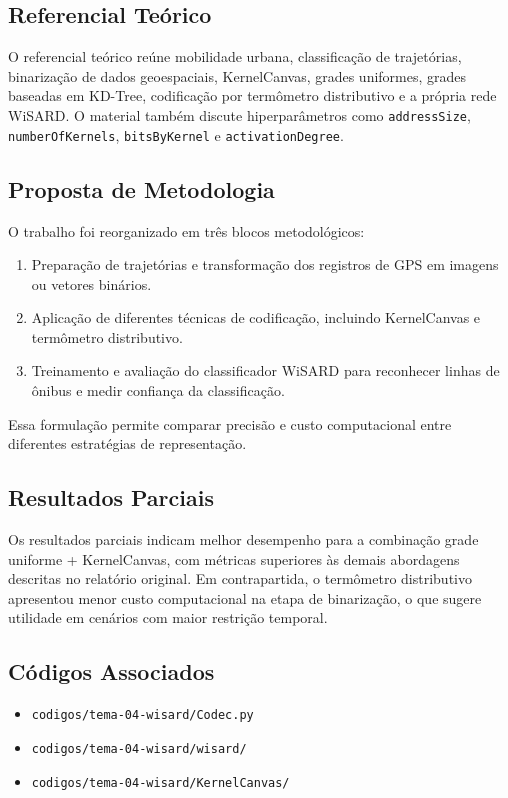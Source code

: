 \documentclass[runningheads]{llncs}
\begin{document}
\subsection{Referencial Teórico}
O referencial teórico reúne mobilidade urbana, classificação de trajetórias, binarização de dados geoespaciais, KernelCanvas, grades uniformes, grades baseadas em KD-Tree, codificação por termômetro distributivo e a própria rede WiSARD. O material também discute hiperparâmetros como \texttt{addressSize}, \texttt{numberOfKernels}, \texttt{bitsByKernel} e \texttt{activationDegree}.

\subsection{Proposta de Metodologia}
O trabalho foi reorganizado em três blocos metodológicos:
\begin{enumerate}[leftmargin=*]
\item Preparação de trajetórias e transformação dos registros de GPS em imagens ou vetores binários.
\item Aplicação de diferentes técnicas de codificação, incluindo KernelCanvas e termômetro distributivo.
\item Treinamento e avaliação do classificador WiSARD para reconhecer linhas de ônibus e medir confiança da classificação.
\end{enumerate}

Essa formulação permite comparar precisão e custo computacional entre diferentes estratégias de representação.

\subsection{Resultados Parciais}
Os resultados parciais indicam melhor desempenho para a combinação grade uniforme + KernelCanvas, com métricas superiores às demais abordagens descritas no relatório original. Em contrapartida, o termômetro distributivo apresentou menor custo computacional na etapa de binarização, o que sugere utilidade em cenários com maior restrição temporal.

\subsection{Códigos Associados}
\begin{itemize}[leftmargin=*]
\item \texttt{codigos/tema-04-wisard/Codec.py}
\item \texttt{codigos/tema-04-wisard/wisard/}
\item \texttt{codigos/tema-04-wisard/KernelCanvas/}
\end{itemize}
\end{document}
